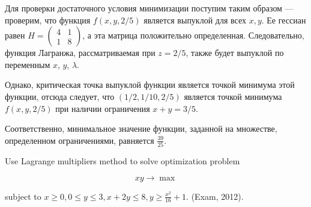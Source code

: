 \begin{solution}
Для проверки достаточного условия минимизации поступим таким образом --- проверим, что функция $f(x,y,2/5)$ является выпуклой для всех $x,y$. Ее гессиан равен $H=\left(\begin{array}{cc} {4} & {1} \\ {1} & {8} \end{array}\right)$, а эта матрица положительно определенная. Следовательно, функция Лагранжа, рассматриваемая при $z=2/5$, также будет выпуклой по переменным $x$, $y$, $\lambda$. 


Однако, критическая точка выпуклой функции является точкой минимума этой функции, отсюда следует, что $(1/2, 1/10, 2/5)$ является точкой минимума $f(x,y,2/5)$ при наличии ограничения $x+y=3/5$.

Соответственно, минимальное значение функции, заданной на множестве, определенном ограничениями, равняется  $\frac{39}{25} $.
\end{solution}


\begin{problem}
Use Lagrange multipliers method to solve optimization problem

\[xy\to \max \] 

subject to $x\ge 0,  0\le y\le 3,  x+2y\le 8,  y\ge \frac{x^{2} }{16} +1$. (Exam, 2012).
\end{problem}

